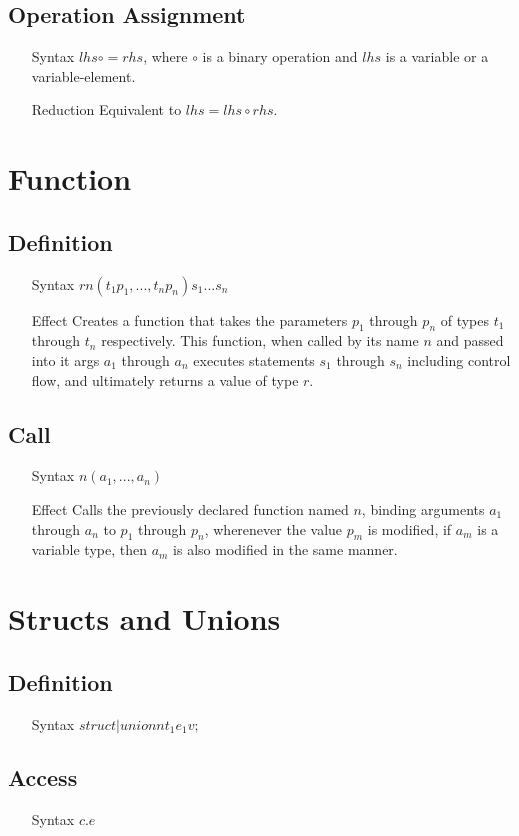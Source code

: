 \subsection{Operation Assignment}
\begin{itemize}
\item[Syntax] $lhs \circ= rhs$, where $\circ$ is a binary operation and $lhs$ is a variable or a variable-element.
\item[Reduction] Equivalent to $lhs = lhs \circ rhs$.
\end{itemize}
\section{Function}
\subsection{Definition}
\begin{itemize}
\item[Syntax] $r n(t_1 p_1, ..., t_n p_n) { s_1 ... s_n }$
\item[Effect] Creates a function that takes the parameters $p_1$ through $p_n$ of types $t_1$ through $t_n$ respectively. This function, when called by its name $n$ and passed into it args $a_1$ through $a_n$ executes statements $s_1$ through $s_n$ including control flow, and ultimately returns a value of type $r$.
\end{itemize}
\subsection{Call}
\begin{itemize}
\item[Syntax] $n(a_1, ..., a_n)$
\item[Effect] Calls the previously declared function named $n$, binding arguments $a_1$ through $a_n$ to $p_1$ through $p_n$, wherenever the value $p_m$ is modified, if $a_m$ is a variable type, then $a_m$ is also modified in the same manner.
\end{itemize}
\section{Structs and Unions}
\subsection{Definition}
\begin{itemize}
\item[Syntax] $struct|union n { t_1 e_1} v;$
\end{itemize}
\subsection{Access}
\begin{itemize}
\item[Syntax] $c.e$
\end{itemize}
